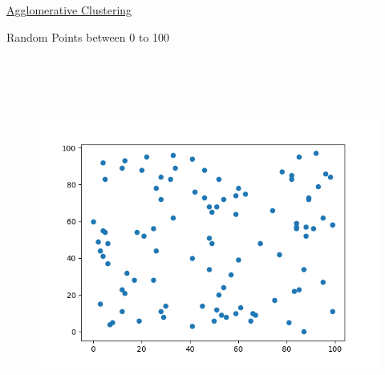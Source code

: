 \documentclass[12pt]{article}
\renewcommand{\_}{\kern-1.5pt\textunderscore\kern-1.5pt}
\begin{document}

\par


\vspace{\baselineskip}

\vspace{\baselineskip}

\vspace{\baselineskip}

\vspace{\baselineskip}

\vspace{\baselineskip}

\vspace{\baselineskip}

\vspace{\baselineskip}

\vspace{\baselineskip}

\vspace{\baselineskip}

\vspace{\baselineskip}

\vspace{\baselineskip}
{\fontsize{14pt}{16.8pt}\selectfont \uline{Agglomerative Clustering}\par}\par

{\fontsize{14pt}{16.8pt} Random Points between 0 to 100\par}\par




\begin{figure}[H]
	\begin{Center}
		\includegraphics[width=6.4in,height=4.8in]{./media/image19.png}
	\end{Center}
\end{figure}
\end{document}
